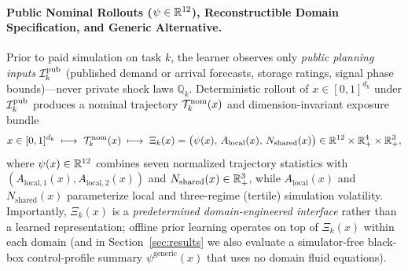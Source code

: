 \paragraph{Public Nominal Rollouts ($\psi \in \mathbb{R}^{12}$), Reconstructible Domain Specification, and Generic Alternative.}
Prior to paid simulation on task $k$, the learner observes only \emph{public planning inputs} $\mathcal{I}_k^{\mathrm{pub}}$ (published demand or arrival forecasts, storage ratings, signal phase bounds)—never private shock laws $\mathbb{Q}_k$. Deterministic rollout of $x \in [0,1]^{d_k}$ under $\mathcal{I}_k^{\mathrm{pub}}$ produces a nominal trajectory $\mathcal{T}_k^{\mathrm{nom}}(x)$ and dimension-invariant exposure bundle
\begin{equation}\label{eq:nominal_exposure}
  x \in [0,1]^{d_k} \;\longmapsto\; \mathcal{T}_k^{\mathrm{nom}}(x) \;\longmapsto\;
  \Xi_k(x) = \big(\psi(x),\, A_{\mathrm{local}}(x),\, N_{\mathrm{shared}}(x)\big) \in \mathbb{R}^{12} \times \mathbb{R}_+^{4} \times \mathbb{R}_+^{3},
\end{equation}
where $\psi(x) \in \mathbb{R}^{12}$ combines seven normalized trajectory statistics with $(A_{\mathrm{local},1}(x), A_{\mathrm{local},2}(x))$ and $N_{\mathrm{shared}}(x) \in \mathbb{R}_+^3$, while $A_{\mathrm{local}}(x)$ and $N_{\mathrm{shared}}(x)$ parameterize local and three-regime (tertile) simulation volatility. Importantly, $\Xi_k(x)$ is a \emph{predetermined domain-engineered interface} rather than a learned representation; offline prior learning operates on top of $\Xi_k(x)$ within each domain (and in Section~\ref{sec:results} we also evaluate a simulator-free black-box control-profile summary $\psi^{\mathrm{generic}}(x)$ that uses no domain fluid equations).

